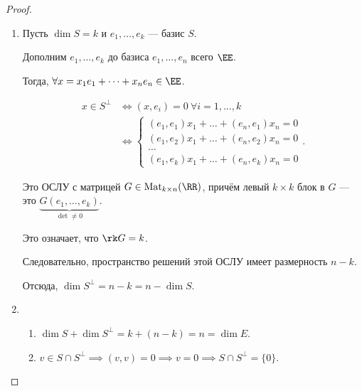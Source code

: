 \documentclass[a4paper]{article}
\begin{document}
\begin{colloq}
            \begin{proof}~
                \begin{enumerate}
                \item 
                    Пусть $\dim S = k$ и $e_1, \dots, e_k$ --- базис $S$.
                    
                    Дополним $e_1, \dots, e_k$ до базиса $e_1, \dots, e_n$ всего $\EE$.

                    Тогда, $\forall x = x_1 e_1 + \dots + x_n e_n \in \EE$.

                    \begin{align*}
                        x \in S^{\perp} &\iff (x, e_i) = 0 \ \forall i = 1, \dots, k \\
                                        &\iff \begin{cases}
                                            (e_1, e_1) x_1 + \dots + (e_n, e_1) x_n = 0 \\
                                            (e_1, e_2) x_1 + \dots + (e_n, e_2) x_n = 0 \\
                                            \dots \\
                                            (e_1, e_k) x_1 + \dots + (e_n, e_k) x_n = 0
                                        \end{cases}
                    .\end{align*}

                    Это ОСЛУ с матрицей $G \in \text{Mat}_{k \times n}(\RR)$, причём левый $k \times k$ блок в $G$ --- это $\underbrace{G(e_1, \dots, e_k)}_{\det \neq 0}$.

                    Это означает, что $\rk G = k$.

                    Следовательно, пространство решений этой ОСЛУ имеет размерность $n - k$.

                    Отсюда, $\dim S^{\perp} = n - k = n - \dim S$.

                \item
                    \begin{enumerate}
                    \item $\dim S + \dim S^{\perp} = k + (n - k) = n = \dim E$.
                    \item $v \in S \cap S^{\perp} \implies (v, v) = 0 \implies v = 0 \implies S \cap S^{\perp} = \{0\}$.
                    \end{enumerate}


\end{enumerate}
\end{proof}
\end{colloq}
\end{document}
